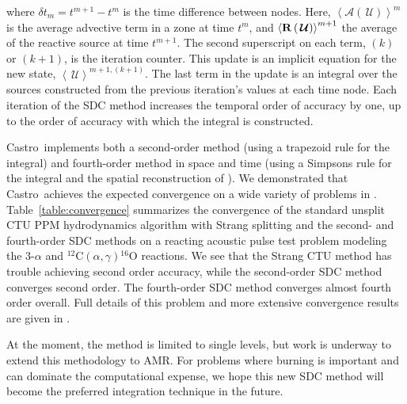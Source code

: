 \documentclass[a4paper]{jpconf}
\newcommand{\castro}{{\sffamily Castro}}
\newcommand{\Uc}{{\,\bm{\mathcal{U}}}}
\newcommand{\Advs}[1]{\boldsymbol{\mathcal{A}} \left(#1\right)}
\newcommand{\isotm}[2]{{}^{#2}\mathrm{#1}}
\newcommand{\avg}[1]{{\left \langle #1 \right \rangle}}
\newcommand{\Rbs}[1]{{\bf R} \left ( #1 \right )}
\begin{document}
where $\delta t_m = t^{m+1} - t^m$ is the time difference between nodes.
Here, $\avg{\Advs{\Uc}}^m$ is the
average advective term in a zone at time $t^m$, and
$\avg{\Rbs{\Uc}}^{m+1}$ the average of the reactive source at time
$t^{m+1}$.  The second superscript on each term, $(k)$ or $(k+1)$, is
the iteration counter.  This update is an implicit equation for the
new state, $\avg{\Uc}^{{m+1},(k+1)}$.  The last term in the update is
an integral over the sources constructed from the previous iteration's
values at each time node.  Each iteration of the SDC method increases
the temporal order of accuracy by one, up to the order of accuracy
with which the integral is constructed.

\castro\ implements both a second-order method (using a trapezoid rule
for the integral) and fourth-order method in space and time (using a
Simpsons rule for the integral and the spatial reconstruction of
\cite{mccorquodalecolella}).  We demonstrated that \castro\ achieves
the expected convergence on a wide variety of problems in
\cite{castro:sdc}.  Table~\ref{table:convergence} summarizes the
convergence of the standard unsplit CTU PPM hydrodynamics algorithm
with Strang splitting and the second- and fourth-order SDC methods on
a reacting acoustic pulse test problem modeling the 3-$\alpha$ and
$\isotm{C}{12}(\alpha,\gamma)\isotm{O}{16}$ reactions.  We see that
the Strang CTU method has trouble achieving second order accuracy,
while the second-order SDC method converges second order.  The
fourth-order SDC method converges almost fourth order overall.  Full
details of this problem and more extensive convergence results are
given in \cite{castro:sdc}.

At the moment, the method is limited to single
levels, but work is underway to extend this methodology to AMR.  For
problems where burning is important and can dominate the computational
expense, we hope this new SDC method will become the preferred
integration technique in the future.
\end{document}
